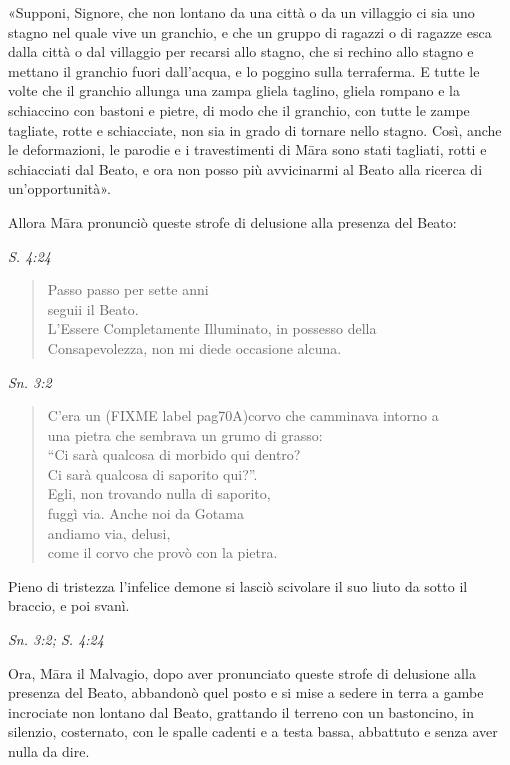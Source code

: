 «Supponi, Signore, che non lontano da una città o da un villaggio ci sia
uno stagno nel quale vive un granchio, e che un gruppo di ragazzi o di
ragazze esca dalla città o dal villaggio per recarsi allo stagno, che si
rechino allo stagno e mettano il granchio fuori dall’acqua, e lo poggino
sulla terraferma. E tutte le volte che il granchio allunga una zampa
gliela taglino, gliela rompano e la schiaccino con bastoni e pietre, di
modo che il granchio, con tutte le zampe tagliate, rotte e schiacciate,
non sia in grado di tornare nello stagno. Così, anche le deformazioni,
le parodie e i travestimenti di Māra sono stati tagliati, rotti e
schiacciati dal Beato, e ora non posso più avvicinarmi al Beato alla
ricerca di un’opportunità».


Allora Māra pronunciò queste strofe di delusione alla presenza del
Beato:


\emph{S. 4:24}


\begin{quote}
Passo passo per sette anni \\
seguii il Beato. \\
L’Essere Completamente Illuminato, in possesso della \\
Consapevolezza, non mi diede occasione alcuna.
\end{quote}

\emph{Sn. 3:2}


\begin{quote}
C’era un (FIXME label pag70A)corvo che camminava intorno a \\
una pietra che sembrava un grumo di grasso: \\
“Ci sarà qualcosa di morbido qui dentro? \\
Ci sarà qualcosa di saporito qui?”. \\
Egli, non trovando nulla di saporito, \\
fuggì via. Anche noi da Gotama \\
andiamo via, delusi, \\
come il corvo che provò con la pietra.
\end{quote}

Pieno di tristezza l’infelice demone si lasciò scivolare il suo liuto da
sotto il braccio, e poi svanì.


\emph{Sn. 3:2; S. 4:24}


Ora, Māra il Malvagio, dopo aver pronunciato queste strofe di delusione
alla presenza del Beato, abbandonò quel posto e si mise a sedere in
terra a gambe incrociate non lontano dal Beato, grattando il terreno con
un bastoncino, in silenzio, costernato, con le spalle cadenti e a testa
bassa, abbattuto e senza aver nulla da dire.



